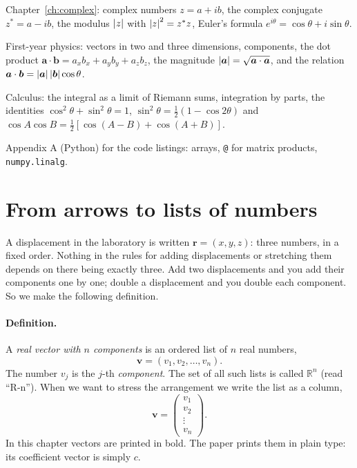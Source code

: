 \begin{prerequisites}
\item Chapter~\ref{ch:complex}: complex numbers $z=a+ib$, the complex conjugate $z^*=a-ib$, the modulus $\left\lvert z\right\rvert$ with $\left\lvert z\right\rvert^2=z^*z$, Euler's formula $e^{i\theta}=\cos\theta+i\sin\theta$.
\item First-year physics: vectors in two and three dimensions, components, the dot product $\bm a\cdot\bm b=a_xb_x+a_yb_y+a_zb_z$, the magnitude $\left\lvert \bm a\right\rvert=\sqrt{\bm a\cdot\bm a}$, and the relation $\bm a\cdot\bm b=\left\lvert \bm a\right\rvert\left\lvert \bm b\right\rvert\cos\theta$.
\item Calculus: the integral as a limit of Riemann sums, integration by parts, the identities $\cos^2\theta+\sin^2\theta=1$, $\sin^2\theta=\tfrac12(1-\cos2\theta)$ and $\cos A\cos B=\tfrac12[\cos(A-B)+\cos(A+B)]$.
\item Appendix A (Python) for the code listings: arrays, \texttt{@} for matrix products, \texttt{numpy.linalg}.
\end{prerequisites}

\section{From arrows to lists of numbers}\label{sec:linear-algebra-lists}

A displacement in the laboratory is written $\bm r=(x,y,z)$: three numbers, in a fixed order. Nothing in the rules for adding displacements or stretching them depends on there being exactly three. Add two displacements and you add their components one by one; double a displacement and you double each component. So we make the following definition.

\paragraph{Definition.} A \emph{real vector with $n$ components} is an ordered list of $n$ real numbers,
\begin{equation}
\bm v=(v_1,v_2,\dots,v_n).
\label{eq:linear-algebra-vector}
\end{equation}
The number $v_j$ is the $j$-th \emph{component}. The set of all such lists is called $\mathbb R^n$ (read ``R-n''). When we want to stress the arrangement we write the list as a column,
\[
\bm v=\begin{pmatrix}v_1\\ v_2\\ \vdots\\ v_n\end{pmatrix}.
\]
In this chapter vectors are printed in bold. The paper prints them in plain type: its coefficient vector is simply $c$.

